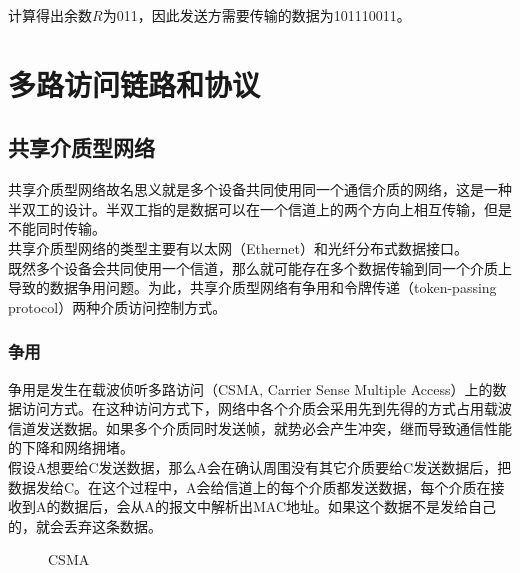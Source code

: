计算得出余数$ R $为011，因此发送方需要传输的数据为101110011。

\newpage

\section{多路访问链路和协议}

\subsection{共享介质型网络}

共享介质型网络故名思义就是多个设备共同使用同一个通信介质的网络，这是一种半双工的设计。半双工指的是数据可以在一个信道上的两个方向上相互传输，但是不能同时传输。\\

共享介质型网络的类型主要有以太网（Ethernet）和光纤分布式数据接口。\\

既然多个设备会共同使用一个信道，那么就可能存在多个数据传输到同一个介质上导致的数据争用问题。为此，共享介质型网络有争用和令牌传递（token-passing protocol）两种介质访问控制方式。\\

\subsubsection{争用}

争用是发生在载波侦听多路访问（CSMA, Carrier Sense Multiple Access）上的数据访问方式。在这种访问方式下，网络中各个介质会采用先到先得的方式占用载波信道发送数据。如果多个介质同时发送帧，就势必会产生冲突，继而导致通信性能的下降和网络拥堵。\\

假设A想要给C发送数据，那么A会在确认周围没有其它介质要给C发送数据后，把数据发给C。在这个过程中，A会给信道上的每个介质都发送数据，每个介质在接收到A的数据后，会从A的报文中解析出MAC地址。如果这个数据不是发给自己的，就会丢弃这条数据。\\

\begin{figure}[H]
    \centering
    \caption{CSMA}
\end{figure}

